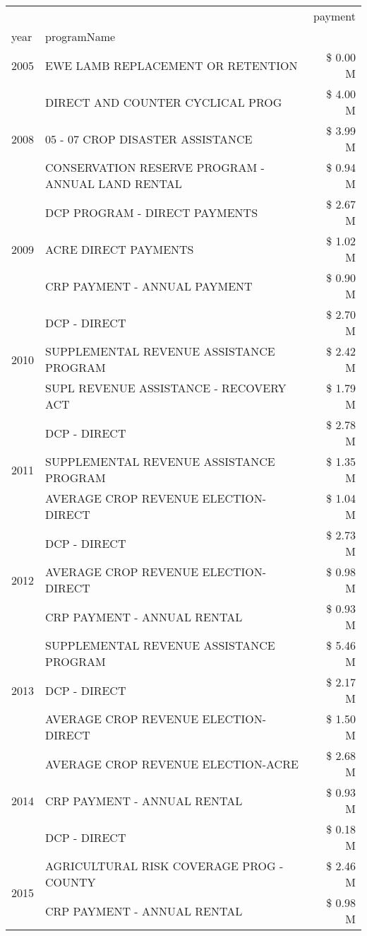 \begin{tabular}{llr}
\toprule
 &  & payment \\
year & programName &  \\
\midrule
2005 & EWE LAMB REPLACEMENT OR RETENTION & \$ 0.00 M \\
\cline{1-3}
\multirow[t]{3}{*}{2008} & DIRECT AND COUNTER CYCLICAL PROG & \$ 4.00 M \\
 & 05 - 07 CROP DISASTER ASSISTANCE & \$ 3.99 M \\
 & CONSERVATION RESERVE PROGRAM - ANNUAL LAND RENTAL & \$ 0.94 M \\
\cline{1-3}
\multirow[t]{3}{*}{2009} & DCP PROGRAM - DIRECT PAYMENTS & \$ 2.67 M \\
 & ACRE DIRECT PAYMENTS & \$ 1.02 M \\
 & CRP PAYMENT - ANNUAL PAYMENT & \$ 0.90 M \\
\cline{1-3}
\multirow[t]{3}{*}{2010} & DCP - DIRECT & \$ 2.70 M \\
 & SUPPLEMENTAL REVENUE ASSISTANCE PROGRAM & \$ 2.42 M \\
 & SUPL REVENUE ASSISTANCE - RECOVERY ACT & \$ 1.79 M \\
\cline{1-3}
\multirow[t]{3}{*}{2011} & DCP - DIRECT & \$ 2.78 M \\
 & SUPPLEMENTAL REVENUE ASSISTANCE PROGRAM & \$ 1.35 M \\
 & AVERAGE CROP REVENUE ELECTION-DIRECT & \$ 1.04 M \\
\cline{1-3}
\multirow[t]{3}{*}{2012} & DCP - DIRECT & \$ 2.73 M \\
 & AVERAGE CROP REVENUE ELECTION-DIRECT & \$ 0.98 M \\
 & CRP PAYMENT - ANNUAL RENTAL & \$ 0.93 M \\
\cline{1-3}
\multirow[t]{3}{*}{2013} & SUPPLEMENTAL REVENUE ASSISTANCE PROGRAM & \$ 5.46 M \\
 & DCP - DIRECT & \$ 2.17 M \\
 & AVERAGE CROP REVENUE ELECTION-DIRECT & \$ 1.50 M \\
\cline{1-3}
\multirow[t]{3}{*}{2014} & AVERAGE CROP REVENUE ELECTION-ACRE & \$ 2.68 M \\
 & CRP PAYMENT - ANNUAL RENTAL & \$ 0.93 M \\
 & DCP - DIRECT & \$ 0.18 M \\
\cline{1-3}
\multirow[t]{3}{*}{2015} & AGRICULTURAL RISK COVERAGE PROG - COUNTY & \$ 2.46 M \\
 & CRP PAYMENT - ANNUAL RENTAL & \$ 0.98 M \\

\end{tabular}
